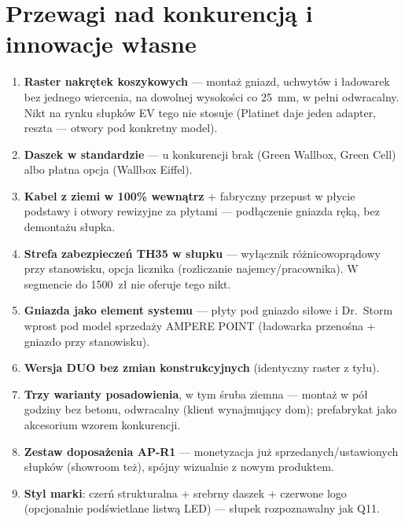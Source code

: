 \documentclass[11pt,a4paper]{article}
\begin{document}
\section{Przewagi nad konkurencją i innowacje własne}
\begin{enumerate}
\item \textbf{Raster nakrętek koszykowych} --- montaż gniazd, uchwytów i ładowarek bez jednego
wiercenia, na dowolnej wysokości co 25~mm, w pełni odwracalny. Nikt na rynku słupków EV tego nie
stosuje (Platinet daje jeden adapter, reszta --- otwory pod konkretny model).
\item \textbf{Daszek w standardzie} --- u konkurencji brak (Green Wallbox, Green Cell) albo płatna
opcja (Wallbox Eiffel).
\item \textbf{Kabel z ziemi w 100\% wewnątrz} + fabryczny przepust w płycie podstawy i otwory
rewizyjne za płytami --- podłączenie gniazda ręką, bez demontażu słupka.
\item \textbf{Strefa zabezpieczeń TH35 w słupku} --- wyłącznik różnicowoprądowy przy stanowisku,
opcja licznika (rozliczanie najemcy/pracownika). W segmencie do 1500~zł nie oferuje tego nikt.
\item \textbf{Gniazda jako element systemu} --- płyty pod gniazdo siłowe i Dr.~Storm wprost pod
model sprzedaży AMPERE POINT (ładowarka przenośna + gniazdo przy stanowisku).
\item \textbf{Wersja DUO bez zmian konstrukcyjnych} (identyczny raster z tyłu).
\item \textbf{Trzy warianty posadowienia}, w tym śruba ziemna --- montaż w pół godziny bez betonu,
odwracalny (klient wynajmujący dom); prefabrykat jako akcesorium wzorem konkurencji.
\item \textbf{Zestaw doposażenia AP-R1} --- monetyzacja już sprzedanych/ustawionych słupków
(showroom też), spójny wizualnie z nowym produktem.
\item \textbf{Styl marki}: czerń strukturalna + srebrny daszek + czerwone logo (opcjonalnie
podświetlane listwą LED) --- słupek rozpoznawalny jak Q11.
\end{enumerate}
\end{document}
